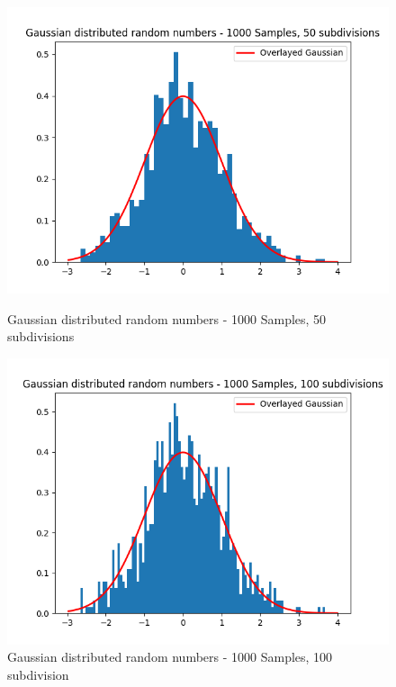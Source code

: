 \documentclass[11pt]{article}
\begin{document}
\begin{figure}[H]
    \centering
    \begin{minipage}{0.48\textwidth}
        \centering
        \includegraphics[width=\textwidth]{Gaussian distributed random numbers - 1000 Samples, 50 subdivisions.png}
        \caption{Gaussian distributed random numbers - 1000 Samples, 50 subdivisions}
        \label{fig:11}
    \end{minipage}\hfill
    \begin{minipage}{0.48\textwidth}
        \centering
        \includegraphics[width=\textwidth]{Gaussian distributed random numbers - 1000 Samples, 100 subdivisions.png}
        \caption{Gaussian distributed random numbers - 1000 Samples, 100 subdivision}
        \label{fig:12}
    \end{minipage}
\end{figure}
\end{document}
